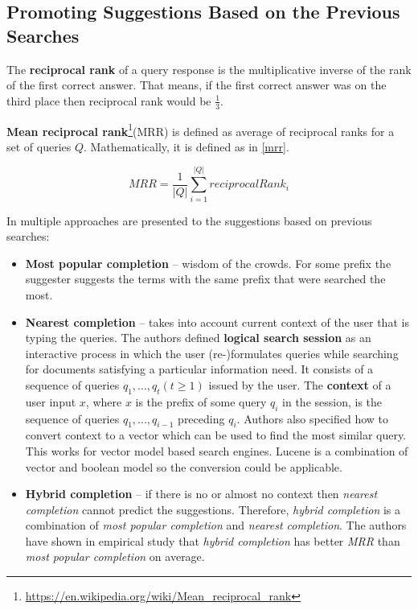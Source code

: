 \subsection{Promoting Suggestions Based on the Previous Searches}
\label{promoting_on_previous_searches}
The \textbf{reciprocal rank} of a query response is the multiplicative inverse of the rank of the first correct answer.
That means, if the first correct answer was on the third place then reciprocal rank would be $\frac{1}{3}$.

\textbf{Mean reciprocal rank}\footnote{\url{https://en.wikipedia.org/wiki/Mean\_reciprocal\_rank}}(MRR) is defined as
average of reciprocal ranks for a set of queries $Q$. Mathematically, it is defined as in \ref{mrr}.

\begin{equation}
\label{mrr}
MRR = \frac{1}{\vert Q \vert} \sum_{i=1}^{\vert Q \vert} reciprocalRank_i
\end{equation}

In \citep{Bar-yossef11context-sensitivequery} multiple approaches are presented to the suggestions based on previous
searches:
\begin{itemize}
    \item \textbf{Most popular completion} – wisdom of the crowds. For some prefix the suggester suggests the terms
    with the same prefix that were searched the most.
    \item \textbf{Nearest completion} – takes into account current context of the user that is typing the queries.
    The authors defined \textbf{logical search session} as an interactive process in which the user (re-)formulates queries
    while searching for documents satisfying a particular information need. It consists of a sequence of
    queries $q_1, . . . , q_t (t \geq 1)$ issued by the user. The \textbf{context} of a user input $x$, where $x$ is the prefix of
    some query $q_i$ in the session, is the sequence of queries $q_1, . . . , q_{i-1}$ preceding $q_i$.
    Authors also specified how to convert context to a vector which can be used to find the most similar query.
    This works for vector model based search engines. Lucene is a combination of vector and boolean model so the
    conversion could be applicable.

    \item \textbf{Hybrid completion} – if there is no or almost no context then \textit{nearest completion} cannot predict the
    suggestions. Therefore, \textit{hybrid completion} is a combination of \textit{most popular completion} and \textit{nearest completion}.
    The authors have shown in empirical study that \textit{hybrid completion} has better \textit{MRR} than
    \textit{most popular completion} on average.
\end{itemize}


